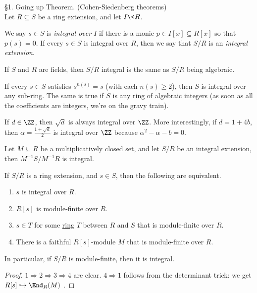 \S 1. Going up Theorem. (Cohen-Siedenberg theorems)\\

 Let $R\subseteq S$ be a ring extension, and let $I\< R$.
 \begin{definition}
   We say $s\in S$ is \emph{integral over $I$} if there is a monic $p\in I[x]\subseteq
   R[x]$ so that $p(s)=0$. If every $s\in S$ is integral over $R$, then we say that $S/R$
   is an \emph{integral extension}.
 \end{definition}
 \begin{example}
   If $S$ and $R$ are fields, then $S/R$ integral is the same as $S/R$ being algebraic.
 \end{example}
 \begin{example}
   If every $s\in S$ satisfies $s^{n(s)}=s$ (with each $n(s)\ge 2$), then $S$ is integral
   over any sub-ring. The same is true if $S$ is any ring of algebraic integers (as soon
   as all the coefficients are integers, we're on the gravy train).
 \end{example}
 \begin{example}
   If $d\in \ZZ$, then $\sqrt d$ is always integral over $\ZZ$. More interestingly, if
   $d=1+4b$, then $\alpha=\frac{1+\sqrt d}{2}$ is integral over $\ZZ$ because
   $\alpha^2-\alpha-b=0$.
 \end{example}
 \begin{example}
   Let $M\subseteq R$ be a multiplicatively closed set, and let $S/R$ be an integral
   extension, then $M^{-1}S/M^{-1}R$ is integral.
 \end{example}
 \begin{proposition}
   If $S/R$ is a ring extension, and $s\in S$, then the following are equivalent.
   \begin{enumerate}
     \item $s$ is integral over $R$.
     \item $R[s]$ is module-finite over $R$.
     \item $s\in T$ for some \underline{ring} $T$ between $R$ and $S$ that is
     module-finite over $R$.
     \item There is a faithful $R[s]$-module $M$ that is module-finite over $R$.
   \end{enumerate}
   In particular, if $S/R$ is module-finite, then it is integral.
 \end{proposition}
 \begin{proof}
   $1\Rightarrow 2\Rightarrow 3\Rightarrow 4$ are clear. $4\Rightarrow 1$ follows from
   the determinant trick: we get $R[s]\hookrightarrow \End_R(M)$ .
 \end{proof}
